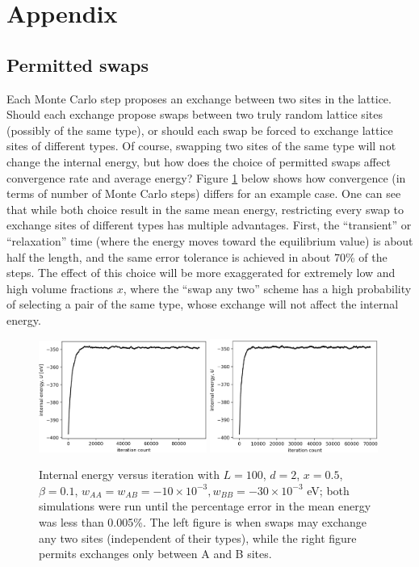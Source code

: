 \documentclass[10pt]{article}
\begin{document}
\newpage
\section{Appendix}
\subsection{Permitted swaps}
Each Monte Carlo step proposes an exchange between two sites in the lattice.
Should each exchange propose swaps between two truly random lattice sites (possibly of the same type), or should each swap be forced to exchange lattice sites of different types.
Of course, swapping two sites of the same type will not change the internal energy, but how does the choice of permitted swaps affect convergence rate and average energy?
Figure \ref{fig:swap} below shows how convergence (in terms of number of Monte Carlo steps) differs for an example case. One can see that while both choice result in the same mean energy, restricting every swap to exchange sites of different types has multiple advantages.
First, the ``transient'' or ``relaxation'' time (where the energy moves toward the equilibrium value) is about half the length, and the same error tolerance is achieved in about 70\% of the steps.
The effect of this choice will be more exaggerated for extremely low and  high volume fractions $x$, where the ``swap any two'' scheme has a high probability of selecting a pair of the same type, whose exchange will not affect the internal energy.

\begin{figure}[h!]
\centering
\includegraphics[width=0.49\textwidth]{Figures/swap_any_two_convergence.png}
\includegraphics[width=0.49\textwidth]{Figures/swap_A_B_only_convergence.png}
\caption{Internal energy versus iteration with $L=100$, $d=2$, $x=0.5$, $\beta=0.1$, $w_{AA}=w_{AB}=-10 \times 10^{-3},w_{BB} = -30 \times 10^{-3}$ eV; both simulations were run until the percentage error in the mean energy was less than 0.005\%.
The left figure is when swaps may exchange any two sites (independent of their types), while the right figure permits exchanges only between A and B sites.}
\label{fig:swap}
\end{figure}
\end{document}
